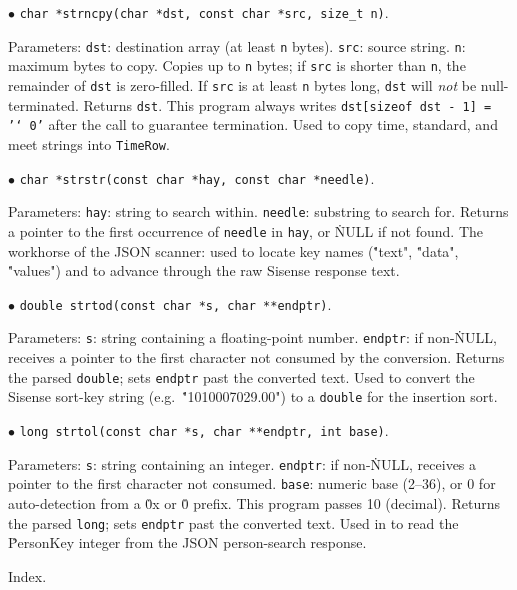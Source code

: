 \item{$\bullet$} {\tt char *strncpy(char *dst, const char *src, size\_t n)}.
\par\noindent Parameters:
\itemitem{--} {\tt dst}: destination array (at least {\tt n} bytes).
\itemitem{--} {\tt src}: source string.
\itemitem{--} {\tt n}: maximum bytes to copy.
Copies up to {\tt n} bytes; if {\tt src} is shorter than {\tt n},
the remainder of {\tt dst} is zero-filled.  If {\tt src} is at least
{\tt n} bytes long, {\tt dst} will {\it not\/} be null-terminated.
Returns {\tt dst}.
This program always writes {\tt dst[sizeof dst - 1] = '\char`\\0'}
after the call to guarantee termination.
Used to copy time, standard, and meet strings into {\tt TimeRow}.

\item{$\bullet$} {\tt char *strstr(const char *hay, const char *needle)}.
\par\noindent Parameters:
\itemitem{--} {\tt hay}: string to search within.
\itemitem{--} {\tt needle}: substring to search for.
Returns a pointer to the first occurrence of {\tt needle} in
{\tt hay}, or \.{NULL} if not found.
The workhorse of the JSON scanner: used to locate key names
(\.{"text"}, \.{"data"}, \.{"values"}) and to advance through
the raw Sisense response text.

\item{$\bullet$} {\tt double strtod(const char *s, char **endptr)}.
\par\noindent Parameters:
\itemitem{--} {\tt s}: string containing a floating-point number.
\itemitem{--} {\tt endptr}: if non-\.{NULL}, receives a pointer to the
first character not consumed by the conversion.
Returns the parsed {\tt double}; sets {\tt *endptr} past the
converted text.
Used to convert the Sisense sort-key string
(e.g.\ \.{"1010007029.00"}) to a {\tt double} for the insertion sort.

\item{$\bullet$} {\tt long strtol(const char *s, char **endptr, int base)}.
\par\noindent Parameters:
\itemitem{--} {\tt s}: string containing an integer.
\itemitem{--} {\tt endptr}: if non-\.{NULL}, receives a pointer to the
first character not consumed.
\itemitem{--} {\tt base}: numeric base (2--36), or 0 for auto-detection
from a \.{0x} or \.{0} prefix.  This program passes 10 (decimal).
Returns the parsed {\tt long}; sets {\tt *endptr} past the converted
text.  Used in  to read the \.{PersonKey} integer from
the JSON person-search response.

\fi

Index.

\fi


\inx
\fin
\con
